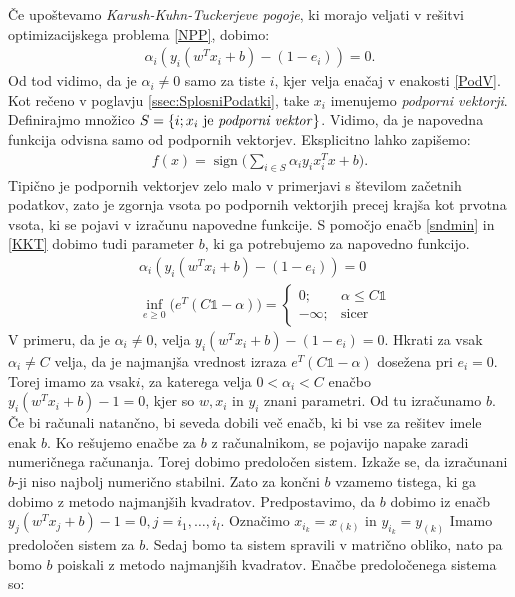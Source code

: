 \documentclass[mat1]{fmfdelo}
\DeclareMathOperator{\sign}{sign}
\begin{document}
Če upoštevamo \emph{Karush-Kuhn-Tuckerjeve pogoje}, ki morajo veljati v rešitvi optimizacijskega problema \eqref{NPP}, dobimo:  %
\begin{align}
\label{KKT}
\alpha_i(y_i(w^Tx_i + b)-(1-e_i)) = 0.
\end{align} 
Od tod vidimo, da je $\alpha_i \ne 0$ samo za tiste $i$, kjer velja enačaj v enakosti \eqref{PodV}. Kot rečeno v poglavju \ref{ssec:SplosniPodatki}, take $x_i$ imenujemo \emph{podporni vektorji}. Definirajmo množico $S = \{i; x_i \text{ je \emph{podporni vektor}}\}$. Vidimo, da je napovedna funkcija odvisna samo od podpornih vektorjev. Eksplicitno lahko zapišemo: 
\begin{align*}
f(x) = \sign\bigg(\sum_{i \in S}\alpha_iy_ix_i^Tx +b\bigg).
\end{align*}
Tipično je podpornih vektorjev zelo malo v primerjavi s številom začetnih podatkov, zato je zgornja vsota po podpornih vektorjih precej krajša kot prvotna vsota, ki se pojavi v izračunu napovedne funkcije. S pomočjo enačb \eqref{sndmin} in \eqref{KKT} dobimo tudi parameter $b$, ki ga potrebujemo za napovedno funkcijo. 
\begin{align*}
&\alpha_i(y_i(w^Tx_i + b)-(1-e_i)) = 0\\
&\inf_{e \ge 0}\bigg(e^T(C\mathds{1}-\alpha)\bigg) = 
\begin{cases}
0; & \alpha \le C\mathds{1}\\
-\infty; & \text{sicer}
\end{cases}
\end{align*} 
V primeru, da je  $\alpha_i \ne 0$, velja $y_i(w^Tx_i + b)-(1-e_i) = 0.$ Hkrati za vsak $\alpha_i \ne C$ velja, da je najmanjša vrednost izraza $e^T(C\mathds{1} - \alpha)$ dosežena pri $e_i=0$. Torej imamo za vsak$i$, za katerega velja $0 < \alpha_i < C$ enačbo $y_i(w^Tx_i + b)- 1 = 0$, kjer so $w, x_i$ in $y_i$ znani parametri. Od tu izračunamo $b$. Če bi računali natančno, bi seveda dobili več enačb, ki bi vse za rešitev imele enak $b$. Ko rešujemo enačbe za $b$ z računalnikom, se pojavijo napake zaradi numeričnega računanja. Torej dobimo predoločen sistem. Izkaže se, da izračunani $b$-ji niso najbolj numerično stabilni. Zato za končni $b$ vzamemo tistega, ki ga dobimo z metodo najmanjših kvadratov. Predpostavimo, da $b$ dobimo iz enačb $y_j(w^Tx_j + b)- 1 = 0, j =i_1,\ldots,i_l$. Označimo $x_{i_k} = x_{(k)}$ in $y_{i_k} = y_{(k)}$ Imamo predoločen sistem za $b$. Sedaj bomo ta sistem spravili v matrično obliko, nato pa bomo $b$ poiskali z metodo najmanjših kvadratov. Enačbe predoločenega sistema so: 
\end{document}
